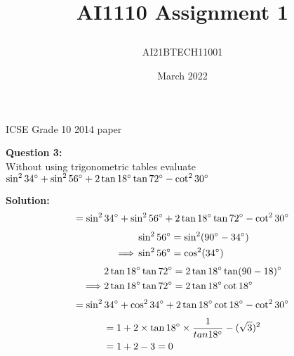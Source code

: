 \documentclass[journal,12pt,twocolumn]{IEEEtran}
\title{\textbf{AI1110 Assignment 1}
\author{AI21BTECH11001 }}
\date{March 2022}
\begin{document}
\maketitle
\begin{center}
{ICSE Grade 10 2014 paper}\end{center}



\textbf{Question 3:}\\
Without using trigonometric tables evaluate\\
\vspace{5mm}
$\sin^2 34\degree+ \sin^2 56\degree+2\tan 18\degree \tan 72\degree - \cot^2 30\degree $ 

\textbf{Solution:}
\begin{align}
= \sin^2 34\degree+ \sin^2 56\degree+2\tan 18\degree \tan 72\degree - \cot^2 30\degree
\end{align}
\begin{align}
 &\sin^2 56\degree = \sin^2 (90\degree - 34\degree)\\
  \implies&\sin^2 56\degree =\cos^2 (34\degree)
  \end{align}
  \begin{align}
  &2\tan18\degree\tan72\degree = 2\tan18\degree\tan(90 - 18)\degree\\
  \implies &2\tan18\degree\tan72\degree = 2\tan18\degree\cot18\degree
 \end{align}
 \begin{align}
= \sin^2 34\degree +\cos^2 34\degree +2\tan18\degree \cot18\degree -\cot^2 30\degree
\end{align}
 \begin{align}
&= 1 + 2\times \tan18\degree \times\frac{1}{tan18\degree} - (\sqrt{3})^2\\
&= 1 + 2 - 3
 = 0\end{align}
\end{document}
